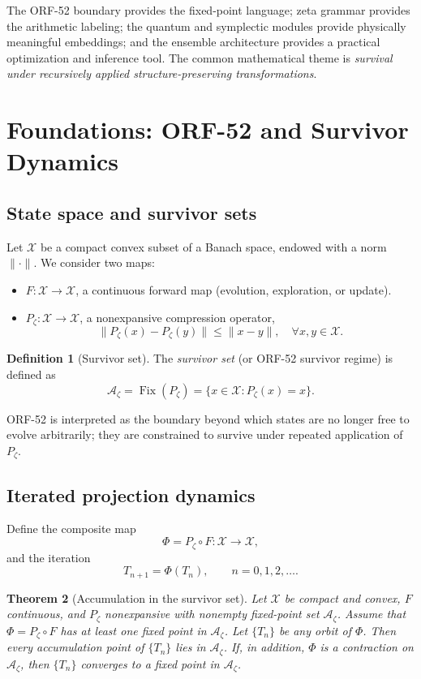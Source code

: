 \documentclass[11pt]{article}
\theoremstyle{definition}
\newtheorem{definition}{Definition}[section]
\theoremstyle{plain}
\newtheorem{theorem}[definition]{Theorem}
\theoremstyle{remark}
\newcommand{\Azet}{\mathcal{A}_\zeta}
\newcommand{\Xc}{\mathcal{X}}
\begin{document}
The ORF-52 boundary provides the fixed-point language; zeta grammar provides the arithmetic labeling; the quantum and symplectic modules provide physically meaningful embeddings; and the ensemble architecture provides a practical optimization and inference tool. The common mathematical theme is \emph{survival under recursively applied structure-preserving transformations}.

\section{Foundations: ORF-52 and Survivor Dynamics}

\subsection{State space and survivor sets}

Let $\Xc$ be a compact convex subset of a Banach space, endowed with a norm $\|\cdot\|$. We consider two maps:
\begin{itemize}
  \item $F:\Xc \to \Xc$, a continuous forward map (evolution, exploration, or update).
  \item $P_\zeta:\Xc \to \Xc$, a nonexpansive compression operator,
  \[
    \| P_\zeta(x) - P_\zeta(y) \| \le \|x - y\|,\quad \forall x,y\in\Xc.
  \]
\end{itemize}

\begin{definition}[Survivor set]
The \emph{survivor set} (or ORF-52 survivor regime) is defined as
\[
\Azet = \operatorname{Fix}(P_\zeta) = \{x\in\Xc: P_\zeta(x)=x\}.
\]
\end{definition}

ORF-52 is interpreted as the boundary beyond which states are no longer free to evolve arbitrarily; they are constrained to survive under repeated application of $P_\zeta$.

\subsection{Iterated projection dynamics}

Define the composite map
\[
\Phi = P_\zeta \circ F : \Xc \to \Xc,
\]
and the iteration
\[
T_{n+1} = \Phi(T_n), \qquad n = 0,1,2,\dots.
\]

\begin{theorem}[Accumulation in the survivor set]
\label{thm:accumulation}
Let $\Xc$ be compact and convex, $F$ continuous, and $P_\zeta$ nonexpansive with nonempty fixed-point set $\Azet$. Assume that $\Phi = P_\zeta \circ F$ has at least one fixed point in $\Azet$. Let $\{T_n\}$ be any orbit of $\Phi$. Then every accumulation point of $\{T_n\}$ lies in $\Azet$. If, in addition, $\Phi$ is a contraction on $\Azet$, then $\{T_n\}$ converges to a fixed point in $\Azet$.
\end{theorem}
\end{document}
